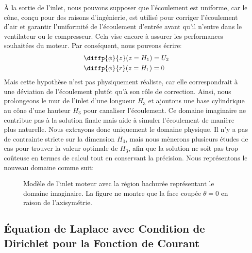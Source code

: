 \documentclass[12pt]{book}
\theoremstyle{bfnote}
\theoremstyle{bfnote}
\begin{document}
À la sortie de l'inlet, nous pouvons supposer que l'écoulement est uniforme, car le cône, conçu pour des raisons d'ingénierie, est utilisé pour corriger l'écoulement d'air et garantir l'uniformité de l'écoulement d'entrée avant qu'il n'entre dans le ventilateur ou le compresseur. Cela vise encore à assurer les performances souhaitées du moteur. Par conséquent, nous pouvons écrire:
\begin{align}
    & \diffp{\phi}{z}(z = H_1) = U_2 \\
    & \diffp{\phi}{r}(z = H_1) = 0
\end{align}
Mais cette hypothèse n'est pas physiquement réaliste, car elle correspondrait à une déviation de l'écoulement plutôt qu'à son rôle de correction. Ainsi, nous prolongeons le mur de l'inlet d'une longueur $H_3$ et ajoutons une base cylindrique au cône d'une hauteur $H_3$ pour canaliser l'écoulement. Ce domaine imaginaire ne contribue pas à la solution finale mais aide à simuler l'écoulement de manière plus naturelle. Nous extrayons donc uniquement le domaine physique. Il n'y a pas de contrainte stricte sur la dimension $H_3$, mais nous mènerons plusieurs études de cas pour trouver la valeur optimale de $H_3$, afin que la solution ne soit pas trop coûteuse en termes de calcul tout en conservant la précision. Nous représentons le nouveau domaine comme suit:
\begin{figure}[h!]
    \centering
    \caption{Modèle de l'inlet moteur avec la région hachurée représentant le domaine imaginaire. La figure ne montre que la face coupée $\theta = 0$ en raison de l'axisymétrie.}
    \label{fig:simplified_flow_dom}
\end{figure}

\subsection{Équation de Laplace avec Condition de Dirichlet pour la Fonction de Courant} %
\label{subsec:Equation_de_Laplace_avec_Condition_de_Dirichlet_pour_la_Fonction_de_Courant}
\end{document}
